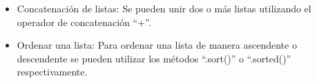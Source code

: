 \begin{itemize}
    \item Concatenación de listas: Se pueden unir dos o más listas utilizando el operador de concatenación ``+''. 
    \begin{figure}[h]
        \centering
      \end{figure}
    
    \item Ordenar una lista: Para ordenar una lista de manera ascendente o descendente se pueden utilizar los métodos ``.sort()'' o ``.sorted()'' respectivamente.
    \begin{figure}[h]
        \centering
      \end{figure}

      \begin{figure}[h]
        \centering
      \end{figure}
    

\end{itemize}
